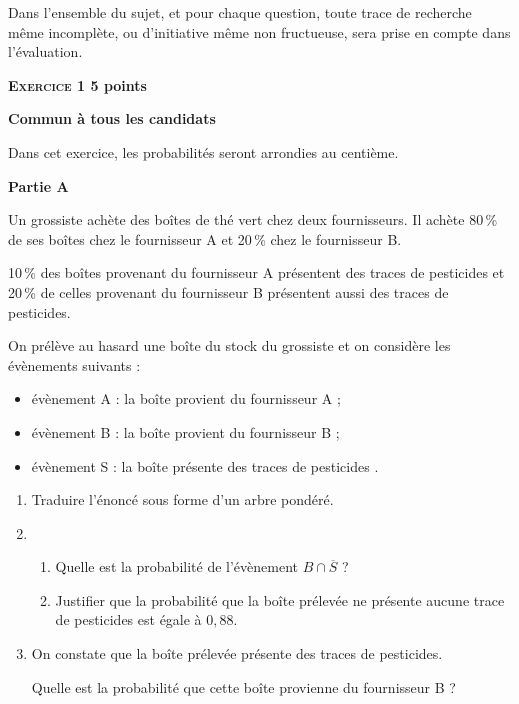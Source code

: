 \documentclass[10pt]{article}
\begin{document}
\vspace{0,25cm}

Dans l'ensemble du sujet, et pour chaque question, toute trace de recherche même incomplète, ou d'initiative même non fructueuse, sera prise en compte dans l'évaluation.

\vspace{0,25cm}

\textbf{\textsc{Exercice 1} \hfill 5 points}

\textbf{Commun  à tous les candidats}

\medskip

Dans cet exercice, les probabilités seront arrondies au centième. 

\bigskip

\textbf{Partie A}

\medskip
 
Un grossiste achète des boîtes de thé vert chez deux fournisseurs. Il achète 80\,\% de ses boîtes chez le fournisseur A et 20\,\% chez le fournisseur B.

\medskip
 
10\,\% des boîtes provenant du fournisseur A présentent des traces de pesticides et 20\,\% de celles provenant du fournisseur B présentent aussi des traces de pesticides.
 
On prélève au hasard une boîte du stock du grossiste et on considère les évènements suivants : 

\setlength\parindent{8mm}
\begin{itemize}
\item évènement A : \og la boîte provient du fournisseur A \fg{} ; 
\item évènement B : \og la boîte provient du fournisseur B \fg{} ; 
\item évènement S : \og la boîte présente des traces de pesticides \fg.
\end{itemize}
\setlength\parindent{0mm}

\medskip
 
\begin{enumerate}
\item Traduire l'énoncé sous forme d'un arbre pondéré. 
\item 
	\begin{enumerate}
		\item Quelle est la probabilité de l'évènement $B \cap \overline{S}$ ? 
		\item Justifier que la probabilité que la boîte prélevée ne présente aucune trace de pesticides est égale à $0,88$.
	\end{enumerate} 
\item On constate que la boîte prélevée présente des traces de pesticides. 

Quelle est la probabilité que cette boîte provienne du fournisseur B ?
\end{enumerate}
\end{document}
